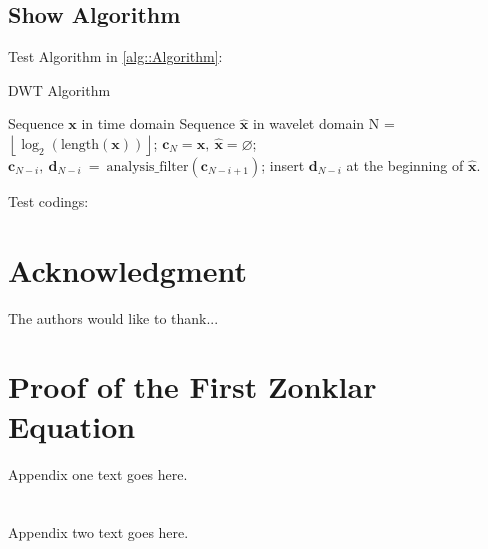 \documentclass[color,hyper]{NRSMRev}
\begin{document}
\subsection{Show Algorithm}

Test Algorithm in \autoref{alg::Algorithm}:

\begin{algorithm}[htbp]
  \caption{DWT Algorithm}
  \label{alg::Algorithm}
  \begin{algorithmic}[1]
    \REQUIRE Sequence $\mathbf{x}$ in time domain
    \ENSURE Sequence $\hat{\mathbf{x}}$ in wavelet domain
    \STATE N = $\left\lfloor \log_2 (\mathrm{length}(\mathbf{x})) \right\rfloor$;
    \STATE $\mathbf{c}_{N} = \mathbf{x},~ \hat{\mathbf{x}} = \varnothing$;
      \STATE $\mathbf{c}_{N-i},~\mathbf{d}_{N-i}~=~\mathrm{analysis\_filter}(\mathbf{c}_{N-i+1})$;
      \STATE insert $\mathbf{d}_{N-i}$ at the beginning of $\hat{\mathbf{x}}$.
    \ENDFOR
  \end{algorithmic}
\end{algorithm}
    
Test codings:



\section*{Acknowledgment}

The authors would like to thank...

\ifCLASSOPTIONcaptionsoff
  \newpage
\fi




\appendices
\section{Proof of the First Zonklar Equation}
Appendix one text goes here.

\section{}
Appendix two text goes here.
\end{document}
